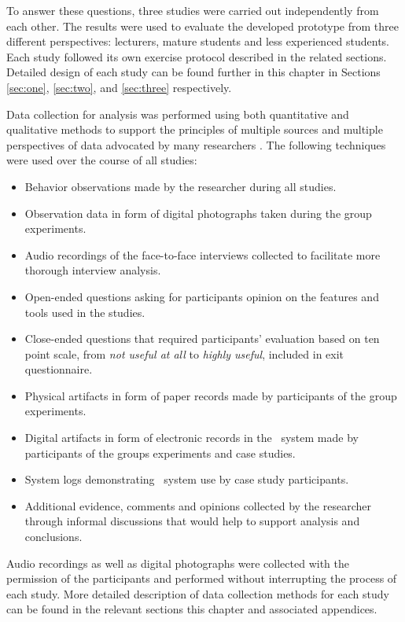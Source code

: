 To answer these questions, three studies were carried out independently from
each other. The results were used to evaluate the developed prototype from three
different perspectives: lecturers, mature students and less experienced
students. Each study followed its own exercise protocol described in the related
sections. Detailed design of each study can be found further in this chapter in
Sections \ref{sec:one}, \ref{sec:two}, and \ref{sec:three} respectively.

Data collection for analysis was performed using both quantitative and
qualitative methods to support the principles of multiple sources and multiple
perspectives of data advocated by many researchers
\citep{Yin2009,Maimbo2005,Marshall2010}. The following techniques were used over
the course of all studies:

\begin{itemize}
  \item Behavior observations made by the researcher during all studies.
  \item Observation data in form of digital photographs taken during the group
  experiments.
  \item Audio recordings of the face-to-face interviews collected to facilitate
  more thorough interview analysis.
  \item Open-ended questions asking for participants opinion on the features and
  tools used in the studies.
  \item Close-ended questions that required participants' evaluation based on
  ten point scale, from \textit{not useful at all} to \textit{highly useful}, 
  included in exit questionnaire.
  \item Physical artifacts in form of paper records made by participants of the
  group experiments.
  \item Digital artifacts in form of electronic records in the \ep~system made
  by participants of the groups experiments and case studies.
  \item System logs demonstrating \ep~system use by case study participants.
  \item Additional evidence, comments and opinions collected by the researcher
  through informal discussions that would help to support analysis and
  conclusions.
\end{itemize}

Audio recordings as well as digital photographs were collected with the
permission of the participants and performed without interrupting the process of
each study. More detailed description of data collection methods for each study
can be found in the relevant sections this chapter and associated appendices. 

